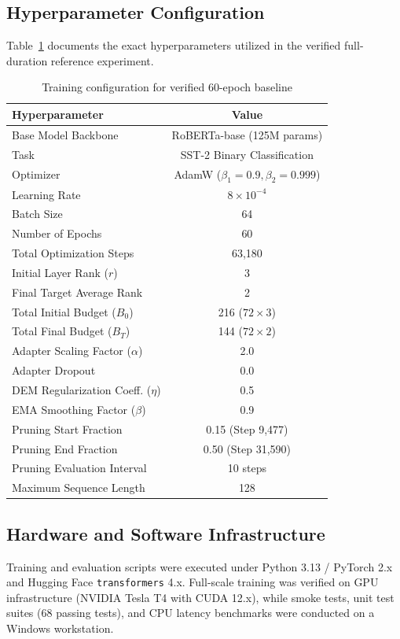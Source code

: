 \documentclass[conference]{IEEEtran}
\begin{document}
\subsection{Hyperparameter Configuration}
Table~\ref{tab:hyperparams} documents the exact hyperparameters utilized in the verified full-duration reference experiment.

\begin{table}[t]
  \centering
  \caption{Training configuration for verified 60-epoch baseline}
  \label{tab:hyperparams}
  \begin{tabular}{lc}
    \toprule
    \textbf{Hyperparameter} & \textbf{Value} \\
    \midrule
    Base Model Backbone & RoBERTa-base (125M params) \\
    Task & SST-2 Binary Classification \\
    Optimizer & AdamW ($\beta_1=0.9, \beta_2=0.999$) \\
    Learning Rate & $8 \times 10^{-4}$ \\
    Batch Size & 64 \\
    Number of Epochs & 60 \\
    Total Optimization Steps & 63,180 \\
    Initial Layer Rank ($r$) & 3 \\
    Final Target Average Rank & 2 \\
    Total Initial Budget ($B_0$) & 216 ($72 \times 3$) \\
    Total Final Budget ($B_T$) & 144 ($72 \times 2$) \\
    Adapter Scaling Factor ($\alpha$) & 2.0 \\
    Adapter Dropout & 0.0 \\
    DEM Regularization Coeff. ($\eta$) & 0.5 \\
    EMA Smoothing Factor ($\beta$) & 0.9 \\
    Pruning Start Fraction & 0.15 (Step 9,477) \\
    Pruning End Fraction & 0.50 (Step 31,590) \\
    Pruning Evaluation Interval & 10 steps \\
    Maximum Sequence Length & 128 \\
    \bottomrule
  \end{tabular}
\end{table}

\subsection{Hardware and Software Infrastructure}
Training and evaluation scripts were executed under Python 3.13 / PyTorch 2.x and Hugging Face \texttt{transformers} 4.x. Full-scale training was verified on GPU infrastructure (NVIDIA Tesla T4 with CUDA 12.x), while smoke tests, unit test suites (68 passing tests), and CPU latency benchmarks were conducted on a Windows workstation.
\end{document}
